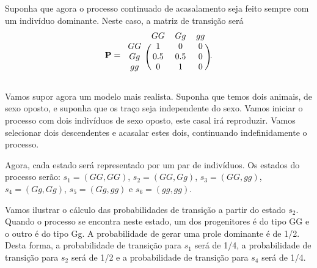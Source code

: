 \begin{questions}
{Suponha que agora o processo continuado de acasalamento seja feito sempre com um
indivíduo dominante. Neste caso, a matriz de transição será
\begin{equation}
\mathbf{P} = 
\begin{blockarray}{cccc}
 & GG & Gg & gg \\
\begin{block}{c(ccc)}
 GG & 1   & 0   & 0  \\
 Gg & 0.5 & 0.5 & 0  \\
 gg & 0   & 1   & 0  \\
\end{block}
\end{blockarray} .
\end{equation}

Vamos supor agora um modelo mais realista. Suponha que temos dois animais, de sexo
oposto, e suponha que os traço seja independente do sexo. Vamos iniciar o processo
com dois indivíduos de sexo oposto, este casal irá reproduzir. Vamos selecionar
dois descendentes e acasalar estes dois, continuando indefinidamente o processo.

Agora, cada estado será representado por um par de indivíduos. Os estados do processo
serão: $s_1 = (GG,GG)$, $s_2 = (GG,Gg)$, $s_3 = (GG,gg)$, $s_4 = (Gg,Gg)$, $s_5 = (Gg,gg)$ e
$s_6 = (gg,gg)$.


}

\begin{solution}
Vamos ilustrar o cálculo das probabilidades de transição a partir do estado $s_2$.
Quando o processo se encontra neste estado, um dos progenitores é do tipo GG e o
outro é do tipo Gg. A probabilidade de gerar uma prole dominante é de 1/2.
Desta forma, a probabilidade de transição para $s_1$ será de 1/4, a probabilidade
de transição para $s_2$ será de 1/2 e a probabilidade de transição para $s_4$
será de 1/4.



\end{solution}
\end{questions}
